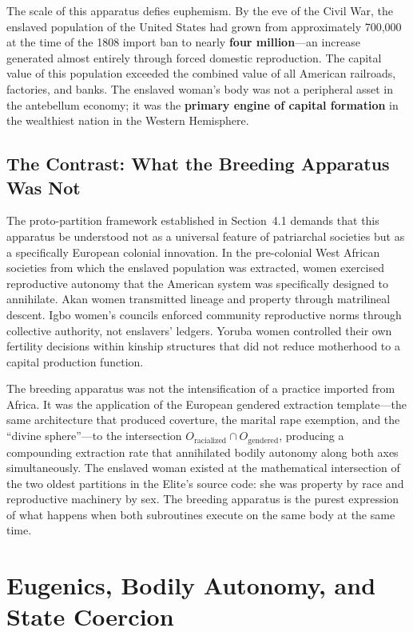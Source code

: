 \documentclass[12pt,openany]{book}
\begin{document}
The scale of this apparatus defies euphemism. By the eve of the Civil War, the enslaved population of the United States had grown from approximately 700,000 at the time of the 1808 import ban to nearly \textbf{four million}---an increase generated almost entirely through forced domestic reproduction. The capital value of this population exceeded the combined value of all American railroads, factories, and banks. The enslaved woman's body was not a peripheral asset in the antebellum economy; it was the \textbf{primary engine of capital formation} in the wealthiest nation in the Western Hemisphere.

\subsection{The Contrast: What the Breeding Apparatus Was Not}

The proto-partition framework established in Section~4.1 demands that this apparatus be understood not as a universal feature of patriarchal societies but as a specifically European colonial innovation. In the pre-colonial West African societies from which the enslaved population was extracted, women exercised reproductive autonomy that the American system was specifically designed to annihilate. Akan women transmitted lineage and property through matrilineal descent. Igbo women's councils enforced community reproductive norms through collective authority, not enslavers' ledgers. Yoruba women controlled their own fertility decisions within kinship structures that did not reduce motherhood to a capital production function.

The breeding apparatus was not the intensification of a practice imported from Africa. It was the application of the European gendered extraction template---the same architecture that produced coverture, the marital rape exemption, and the ``divine sphere''---to the intersection $O_{\text{racialized}} \cap O_{\text{gendered}}$, producing a compounding extraction rate that annihilated bodily autonomy along both axes simultaneously. The enslaved woman existed at the mathematical intersection of the two oldest partitions in the Elite's source code: she was property by race and reproductive machinery by sex. The breeding apparatus is the purest expression of what happens when both subroutines execute on the same body at the same time.

\section{Eugenics, Bodily Autonomy, and State Coercion}
\end{document}
